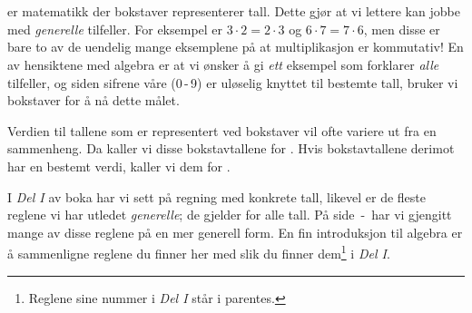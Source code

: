 




\section{\algintro}
 er matematikk der bokstaver representerer tall. Dette gjør at vi lettere kan jobbe med \textsl{generelle} tilfeller. For eksempel er $ {3\cdot 2=2\cdot3} $ og $ {6\cdot7=7\cdot6} $, men disse er bare to av de uendelig mange eksemplene på at multiplikasjon er kommutativ! En av hensiktene med algebra er at vi ønsker å gi \textsl{ett} eksempel som forklarer \textsl{alle} tilfeller, og siden sifrene våre (0\,-\,9) er uløselig knyttet til bestemte tall, bruker vi bokstaver for å nå dette målet. \vsk

Verdien til tallene som er representert ved bokstaver vil ofte variere ut fra en sammenheng. Da kaller vi disse bokstavtallene for . Hvis bokstavtallene derimot har en bestemt verdi, kaller vi dem for .

\vsk

I \textsl{Del I} av boka har vi sett på regning med konkrete tall, likevel er de fleste reglene vi har utledet \textsl{generelle}; de gjelder for alle tall. På side \pageref{regstart}\,-\,\pageref{regslutt} har vi gjengitt mange av disse reglene på en mer generell form. En fin introduksjon til algebra er å sammenligne reglene du finner her med slik du finner dem\footnote{Reglene sine nummer i \textsl{Del I} står i parentes.} i \textsl{Del I}. \vsk

\regv
\label{regstart}
\reg[\adkom\;(\ref{adkom}) \label{adkomalg}]{
\[ a+ b =b+a \]
}
\eks{ \vs
\[ 7+ 5=5+7 \]
} \vsk \vsk
\newpage
\reg[\gangkom\;(\ref{gangkom})]{
	\[ a\cdot b =b\cdot a \]
}
\eks[1]{ \vs
	\[ 9\cdot 8=8\cdot9 \]
}
\eks[2]{ \vs
\[  8\cdot a= a\cdot 8  \]
}

\vsk 

\reg[\brdef\;(\ref{brdef})]{
\[ a:b=\frac{a}{b} \]
}
\eks[1]{ \vs
\[a:2= \frac{a}{2} \]
}


